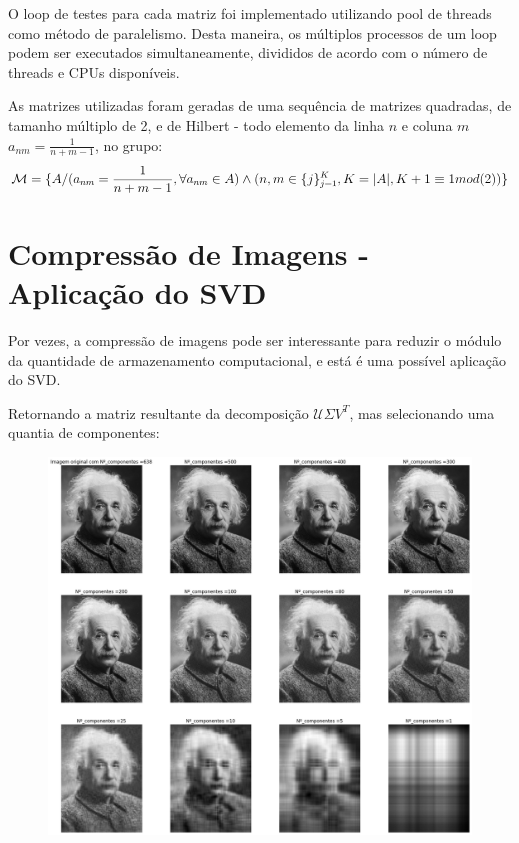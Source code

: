 \documentclass{article}
\begin{document}
O loop de testes para cada matriz foi implementado utilizando pool de threads como método de paralelismo. Desta maneira, os múltiplos processos de um loop podem ser executados simultaneamente, divididos de acordo com o número de threads e CPUs disponíveis.

As matrizes utilizadas foram geradas de uma sequência de matrizes quadradas, de tamanho múltiplo de 2, e de Hilbert - todo elemento da linha $n$ e coluna $m$ $a_{nm} = \frac{1}{n+m-1}$, no grupo:
\begin{equation}
    \mathlarger{
    \mathcal{M} = \{ A / (a_{nm} = \frac{1}{n+m-1}, \forall a_{nm} \in A) \wedge (n,m \in \{j \}_{j=1}^{K}, K = |A|, K+1 \equiv 1mod(2) )\}
    }
\end{equation}

\pagebreak

\section{Compressão de Imagens - Aplicação do SVD}

\hfill

Por vezes, a compressão de imagens pode ser interessante para reduzir o módulo da quantidade de armazenamento computacional, e está é uma possível aplicação do SVD.

Retornando a matriz resultante da decomposição $\mathcal{U} \Sigma V^T$, mas selecionando uma quantia de componentes:

\hfill


\begin{figure}[!ht]
\begin{center}
  \includegraphics[width=0.85\linewidth]{images/svd_compressao.png}
\end{center}
\end{figure}
\end{document}
